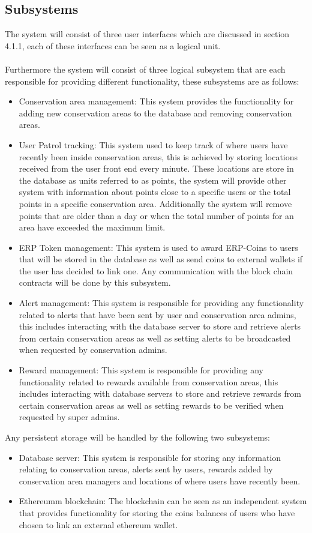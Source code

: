 \documentclass{article}
\begin{document}
\subsection{Subsystems}
The system will consist of three user interfaces which are discussed in section 4.1.1, each of these interfaces can be seen as a logical unit. \\\\Furthermore the system will consist of three logical subsystem that are each responsible for providing different functionality, these subsystems are as follows:
\begin{itemize}
\item Conservation area management:
This system provides the functionality for adding new conservation areas to the database and removing conservation areas.
\item User Patrol tracking:
This system used to keep track of where users have recently been inside conservation areas, this is achieved by storing locations received from the user front end every minute. These locations are store in the database as units referred to as points, the system will provide other system with information about points close to a specific users or the total points in a specific conservation area. Additionally the system will remove points that are older than a day or when the total number of points for an area have exceeded the maximum limit.
\item ERP Token management:
This system is used to award ERP-Coins to users that will be stored in the database as well as send coins to external wallets if the user has decided to link one. Any communication with the block chain contracts will be done by this subsystem.
\item Alert management:
This system is responsible for providing any functionality related to alerts that have been sent by user and conservation area admins, this includes interacting with the database server to store and retrieve alerts from certain conservation areas as well as setting alerts to be broadcasted when requested by conservation admins.
\item Reward management:
This system is responsible for providing any functionality related to rewards available from conservation areas, this includes interacting with database servers to store and retrieve rewards from certain conservation areas as well as setting rewards to be verified when requested by super admins.
\end{itemize} 
Any persistent storage will be handled by the following two subsystems:
\begin{itemize}
\item Database server:
This system is responsible for storing any information relating to conservation areas, alerts sent by users, rewards added by conservation area managers and locations of where users have recently been.
\item Ethereumm blockchain:
The blockchain can be seen as an independent system that provides functionality for storing the coins balances of users who have chosen to link an external ethereum wallet.  
\end{itemize}
\end{document}
